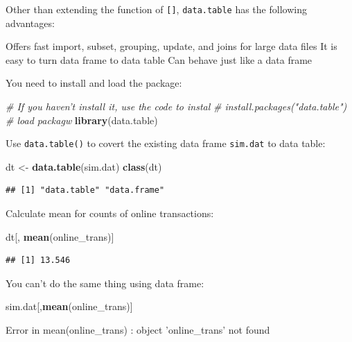 \documentclass[]{book}
\newenvironment{Shaded}{\begin{snugshade}}{\end{snugshade}}
\newcommand{\KeywordTok}[1]{\textcolor[rgb]{0.13,0.29,0.53}{\textbf{{#1}}}}
\newcommand{\StringTok}[1]{\textcolor[rgb]{0.31,0.60,0.02}{{#1}}}
\newcommand{\CommentTok}[1]{\textcolor[rgb]{0.56,0.35,0.01}{\textit{{#1}}}}
\newcommand{\NormalTok}[1]{{#1}}
\theoremstyle{definition}
\theoremstyle{definition}
\theoremstyle{remark}
\begin{document}
Other than extending the function of \texttt{{[}{]}},
\texttt{data.table} has the following advantages:

Offers fast import, subset, grouping, update, and joins for large data
files It is easy to turn data frame to data table Can behave just like a
data frame

You need to install and load the package:

\begin{Shaded}
\begin{Highlighting}[]
\CommentTok{# If you haven't install it, use the code to instal}
\CommentTok{# install.packages("data.table")}
\CommentTok{# load packagw}
\KeywordTok{library}\NormalTok{(data.table)}
\end{Highlighting}
\end{Shaded}

Use \texttt{data.table()} to covert the existing data frame
\texttt{sim.dat} to data table:

\begin{Shaded}
\begin{Highlighting}[]
\NormalTok{dt <-}\StringTok{ }\KeywordTok{data.table}\NormalTok{(sim.dat)}
\KeywordTok{class}\NormalTok{(dt)}
\end{Highlighting}
\end{Shaded}

\begin{verbatim}
## [1] "data.table" "data.frame"
\end{verbatim}

Calculate mean for counts of online transactions:

\begin{Shaded}
\begin{Highlighting}[]
\NormalTok{dt[, }\KeywordTok{mean}\NormalTok{(online_trans)]}
\end{Highlighting}
\end{Shaded}

\begin{verbatim}
## [1] 13.546
\end{verbatim}

You can't do the same thing using data frame:

\begin{Shaded}
\begin{Highlighting}[]
\NormalTok{sim.dat[,}\KeywordTok{mean}\NormalTok{(online_trans)]}
\end{Highlighting}
\end{Shaded}

\begin{Shaded}
\begin{Highlighting}[]
\NormalTok{Error in mean(online_trans) : object 'online_trans' not found}
\end{Highlighting}
\end{Shaded}
\end{document}
